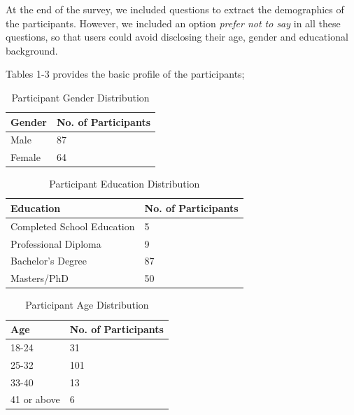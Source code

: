 \documentclass[conference]{IEEEtran}
\begin{document}
At the end of the survey, we included questions to extract the demographics of the participants. However, we included an option \textit{prefer not to say} in all these questions, so that users could avoid disclosing their age, gender and educational background.

Tables 1-3 provides the basic profile of the participants;

\begin{center}
\begin{table}[htbp]
\caption{Participant Gender Distribution}
\begin{center}
\begin{tabular}{|l|l|} 
\hline
Gender & No. of Participants \\
\hline
Male & 87 \\
\hline
Female & 64 \\
\hline
\end{tabular}
\end{center}
\end{table}
\end{center} 

\begin{center}
\begin{table}[htbp]
\caption{Participant Education Distribution}
\begin{center}

\begin{tabular}{|l|l|} 
\hline
Education & No. of Participants \\
\hline
Completed School Education & 5 \\
\hline
Professional Diploma & 9 \\
\hline
Bachelor's Degree & 87 \\
\hline
Masters/PhD & 50 \\
\hline
\end{tabular}
\end{center}
\end{table}
\end{center} 

\begin{center}
\begin{table}[htbp]
\caption{Participant Age Distribution}
\begin{center}
\begin{tabular}{|l|l|} 
\hline
Age & No. of Participants \\
\hline
18-24  & 31 \\
\hline
25-32 & 101 \\
\hline
33-40& 13 \\
\hline
41 or above & 6\\
\hline
\end{tabular}
\end{center}
\end{table}
\end{center} 
\end{document}
